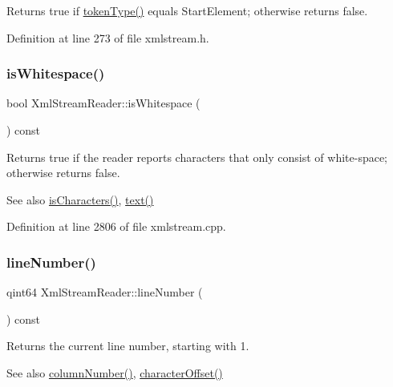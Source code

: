 Returns {\ttfamily true} if \hyperlink{class_xml_stream_reader_a2c26bfb63c27f2992e24f038d65c8c0a}{token\+Type()} equals  Start\+Element; otherwise returns {\ttfamily false}. 

Definition at line 273 of file xmlstream.\+h.

\mbox{\label{class_xml_stream_reader_a15550b223a59978b612b0fc32bd543e1}} 
\subsubsection{\texorpdfstring{is\+Whitespace()}{isWhitespace()}}
{\footnotesize\ttfamily bool Xml\+Stream\+Reader\+::is\+Whitespace (\begin{DoxyParamCaption}{ }\end{DoxyParamCaption}) const}

Returns {\ttfamily true} if the reader reports characters that only consist of white-\/space; otherwise returns {\ttfamily false}.

\begin{DoxySeeAlso}{See also}
\hyperlink{class_xml_stream_reader_a6d14d53c064bab08ac876ffaf2448742}{is\+Characters()}, \hyperlink{class_xml_stream_reader_a1d129d0171b231efac34d7ee4480a50f}{text()} 
\end{DoxySeeAlso}


Definition at line 2806 of file xmlstream.\+cpp.

\mbox{\label{class_xml_stream_reader_a74a3827867942f9904924f2004c4177e}} 
\subsubsection{\texorpdfstring{line\+Number()}{lineNumber()}}
{\footnotesize\ttfamily qint64 Xml\+Stream\+Reader\+::line\+Number (\begin{DoxyParamCaption}{ }\end{DoxyParamCaption}) const}

Returns the current line number, starting with 1.

\begin{DoxySeeAlso}{See also}
\hyperlink{class_xml_stream_reader_a88724d9577a835b0e8d84ed945c306df}{column\+Number()}, \hyperlink{class_xml_stream_reader_a08a187eb8969ddabf238e1f731bb754a}{character\+Offset()} 
\end{DoxySeeAlso}


